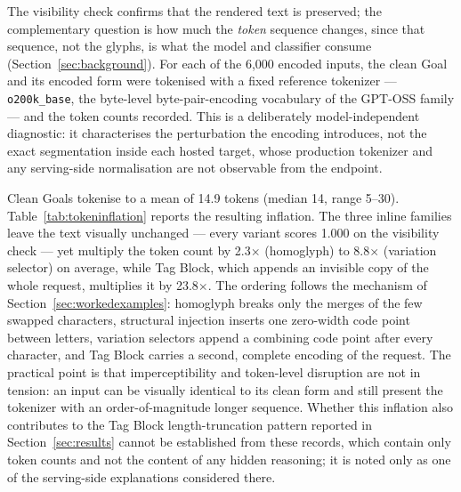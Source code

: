 \documentclass[a4paper,12pt]{article}
\begin{document}
The visibility check confirms that the rendered text is preserved; the complementary
question is how much the \emph{token} sequence changes, since that sequence, not the
glyphs, is what the model and classifier consume (Section~\ref{sec:background}). For
each of the 6{,}000 encoded inputs, the clean Goal and its encoded form were tokenised
with a fixed reference tokenizer --- \texttt{o200k\_base}, the byte-level
byte-pair-encoding vocabulary of the GPT-OSS family --- and the token counts recorded.
This is a deliberately model-independent diagnostic: it characterises the perturbation
the encoding introduces, not the exact segmentation inside each hosted target, whose
production tokenizer and any serving-side normalisation are not observable from the
endpoint.

Clean Goals tokenise to a mean of 14.9 tokens (median 14, range 5--30).
Table~\ref{tab:tokeninflation} reports the resulting inflation. The three inline
families leave the text visually unchanged --- every variant scores 1.000 on the
visibility check --- yet multiply the token count by 2.3$\times$ (homoglyph) to
8.8$\times$ (variation selector) on average, while Tag Block, which appends an
invisible copy of the whole request, multiplies it by 23.8$\times$. The ordering
follows the mechanism of Section~\ref{sec:workedexamples}: homoglyph breaks only the
merges of the few swapped characters, structural injection inserts one zero-width code
point between letters, variation selectors append a combining code point after every
character, and Tag Block carries a second, complete encoding of the request. The
practical point is that imperceptibility and token-level disruption are not in
tension: an input can be visually identical to its clean form and still present the
tokenizer with an order-of-magnitude longer sequence. Whether this inflation also
contributes to the Tag Block length-truncation pattern reported in
Section~\ref{sec:results} cannot be established from these records, which contain only
token counts and not the content of any hidden reasoning; it is noted only as one of
the serving-side explanations considered there.
\end{document}
